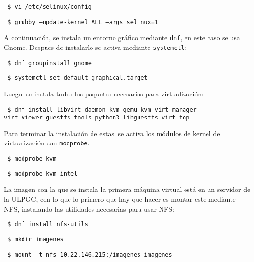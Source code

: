 \documentclass{article}
\begin{document}
\vspace{0.2cm}

\texttt{
\$ vi /etc/selinux/config
}

\texttt{
\$ grubby --update-kernel ALL --args selinux=1
}

\vspace{0.2cm}

A continuación, se instala un entorno gráfico mediante \texttt{dnf},
en este caso se usa Gnome. Despues de instalarlo se activa mediante \texttt{systemctl}:


\vspace{0.2cm}

\texttt{
\$ dnf groupinstall gnome
}

\texttt{
\$ systemctl set-default graphical.target
}

\vspace{0.2cm}

Luego, se instala todos los paquetes necesarios para virtualización:

\vspace{0.2cm}

\texttt{
\$ dnf install libvirt-daemon-kvm qemu-kvm virt-manager \\ virt-viewer guestfs-tools python3-libguestfs virt-top
}

\vspace{0.2cm}

Para terminar la instalación de estas,
se activa los módulos de kernel de virtualización con \texttt{modprobe}:


\vspace{0.2cm}

\texttt{
\$ modprobe kvm
}

\texttt{
\$ modprobe kvm\_intel
}

\vspace{0.2cm}

La imagen con la que se instala la primera máquina virtual está en un servidor
de la ULPGC, con lo que lo primero que hay que hacer es montar este mediante NFS,
instalando las utilidades necesarias para usar NFS:

\vspace{0.2cm}

\texttt{
\$ dnf install nfs-utils
}

\texttt{
\$ mkdir imagenes
}

\texttt{
\$ mount -t nfs 10.22.146.215:/imagenes imagenes
}

\vspace{0.2cm}
\end{document}
